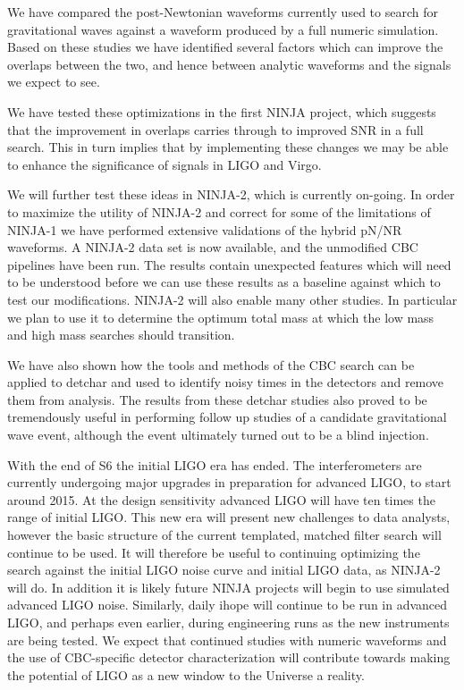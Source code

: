We have compared the post-Newtonian waveforms currently used to
search for gravitational waves against a waveform produced by 
a full numeric simulation.  Based on these studies we have identified
several factors which can improve the overlaps between the two, and
hence between analytic waveforms and the signals we expect to see.

We have tested these optimizations in the first NINJA project, which
suggests that the improvement in overlaps carries through to improved
SNR in a full search.  This in turn implies that by implementing these
changes we may be able to enhance the significance of signals in LIGO
and Virgo.

We will further test these ideas in NINJA-2, which is currently
on-going.  In order to maximize the utility of NINJA-2 and correct
for some of the limitations of NINJA-1 we have performed extensive
validations of the hybrid pN/NR waveforms.  A NINJA-2 data set is now
available, and the unmodified CBC pipelines have been run.  The
results contain unexpected features which will need to be understood
before we can use these results as a baseline against which to test
our modifications.  NINJA-2 will also enable many other studies.  In
particular we plan to use it to determine the optimum total mass at
which the low mass and high mass searches should transition.

We have also shown how the tools and methods of the CBC search can be
applied to detchar and used to identify noisy times in the detectors
and remove them from analysis.  The results from these detchar studies
also proved to be tremendously useful in performing follow up studies
of a candidate gravitational wave event, although the event ultimately
turned out to be a blind injection.

With the end of S6 the initial LIGO era has ended.  The
interferometers are currently undergoing major upgrades in preparation
for advanced LIGO, to start around 2015.  At the design sensitivity
advanced LIGO will have ten times the range of initial LIGO.  This new
era will present new challenges to data analysts, however the basic
structure of the current templated, matched filter search will
continue to be used.   It will therefore be useful to continuing
optimizing the search against the initial LIGO noise curve and initial
LIGO data, as NINJA-2 will do.  In addition it is likely future NINJA
projects will begin to use simulated advanced LIGO noise.  Similarly,
daily ihope will continue to be run in advanced LIGO, and perhaps even
earlier, during engineering runs as the new instruments are being
tested.  We expect that continued studies with numeric waveforms and
the use of CBC-specific detector characterization will contribute
towards making the potential of LIGO as a new window to the Universe a
reality.


